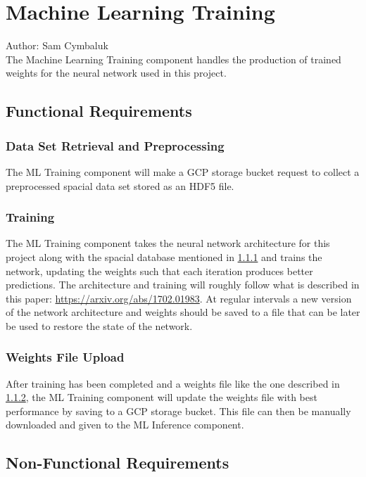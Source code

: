 \documentclass[12pt]{article}
\begin{document}
\section{Machine Learning Training}
Author: Sam Cymbaluk\\

\noindent The Machine Learning Training component handles the production of trained weights for the neural network used in this project.

\subsection{Functional Requirements}

\subsubsection{Data Set Retrieval and Preprocessing} \label{data retrieval}
The ML Training component will make a GCP storage bucket request to collect a preprocessed spacial data set stored as an HDF5 file.

\subsubsection{Training} \label{training}
The ML Training component takes the neural network architecture for this project along with the spacial database mentioned in \ref{data retrieval} and trains the network, updating the weights such that each iteration produces better predictions. The architecture and training will roughly follow what is described in this paper: \url{https://arxiv.org/abs/1702.01983}. At regular intervals a new version of the network architecture and weights should be saved to a file that can be later be used to restore the state of the network.

\subsubsection{Weights File Upload}
After training has been completed and a weights file like the one described in \ref{training}, the ML Training component will update the weights file with best performance by saving to a GCP storage bucket. This file can then be manually downloaded and given to the ML Inference component.

\subsection{Non-Functional Requirements}
\end{document}
